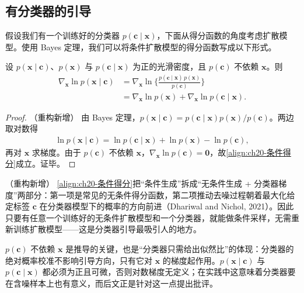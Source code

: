 \documentclass[../../main.tex]{subfiles}
\begin{document}
\subsection{有分类器的引导}\label{subsection:ch20-有分类器的引导}

假设我们有一个训练好的分类器 $p(\bm{c}\mid\bm{x})$，下面从得分函数的角度考虑扩散模型。使用 Bayes 定理，我们可以将条件扩散模型的得分函数写成以下形式。

\begin{proposition}[分类器引导的得分分解]\label{proposition:ch20-分类器引导}
设 $p(\bm{x}\mid\bm{c})$、$p(\bm{x})$ 与 $p(\bm{c}\mid\bm{x})$ 为正的光滑密度，且 $p(\bm{c})$ 不依赖 $\bm{x}$。则
\begin{align}
\nabla_{\bm{x}}\ln p(\bm{x}\mid\bm{c})&=\nabla_{\bm{x}}\ln\Big\{\frac{p(\bm{c}\mid\bm{x})\,p(\bm{x})}{p(\bm{c})}\Big\}\nonumber\\
&=\nabla_{\bm{x}}\ln p(\bm{x})+\nabla_{\bm{x}}\ln p(\bm{c}\mid\bm{x}).
\label{align:ch20-条件得分}
\end{align}
\end{proposition}

\begin{proof}（重构新增）
由 Bayes 定理，$p(\bm{x}\mid\bm{c})=p(\bm{c}\mid\bm{x})p(\bm{x})/p(\bm{c})$。两边取对数得
\begin{align*}
\ln p(\bm{x}\mid\bm{c})=\ln p(\bm{c}\mid\bm{x})+\ln p(\bm{x})-\ln p(\bm{c}),
\end{align*}
再对 $\bm{x}$ 求梯度。由于 $p(\bm{c})$ 不依赖 $\bm{x}$，$\nabla_{\bm{x}}\ln p(\bm{c})=\bm{0}$，故\eqref{align:ch20-条件得分}成立。证毕。
\end{proof}

\begin{remark}（重构新增）
\eqref{align:ch20-条件得分}把“条件生成”拆成“无条件生成 + 分类器梯度”两部分：第一项是常见的无条件得分函数，第二项推动去噪过程朝着最大化给定标签 $\bm{c}$ 在分类器模型下的概率的方向前进（Dhariwal and Nichol, 2021）。因此只要有任意一个训练好的无条件扩散模型和一个分类器，就能做条件采样，无需重新训练扩散模型——这是分类器引导最吸引人的地方。\par
$p(\bm{c})$ 不依赖 $\bm{x}$ 是推导的关键，也是“分类器只需给出似然比”的体现：分类器的绝对概率校准不影响引导方向，只有它对 $\bm{x}$ 的梯度起作用。$p(\bm{x}\mid\bm{c})$ 与 $p(\bm{c}\mid\bm{x})$ 都必须为正且可微，否则对数梯度无定义；在实践中这意味着分类器要在含噪样本上也有意义，而后文正是针对这一点提出批评。\par
\end{remark}
\end{document}
